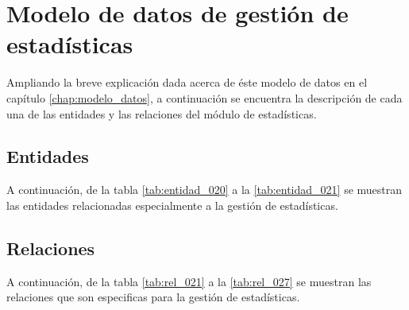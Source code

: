\section{Modelo de datos de gestión de estadísticas}
Ampliando la breve explicación dada acerca de éste modelo de datos en el capítulo \ref{chap:modelo_datos}, a continuación se encuentra la descripción de cada una de las entidades y las relaciones del módulo de estadísticas.

\subsection{Entidades}
A continuación, de la tabla \ref{tab:entidad_020} a la \ref{tab:entidad_021} se muestran las entidades relacionadas especialmente a la gestión de estadísticas.

\clearpage



\subsection{Relaciones}
A continuación, de la tabla \ref{tab:rel_021} a la \ref{tab:rel_027} se muestran las relaciones que son especificas para la gestión de estadísticas.

\clearpage







